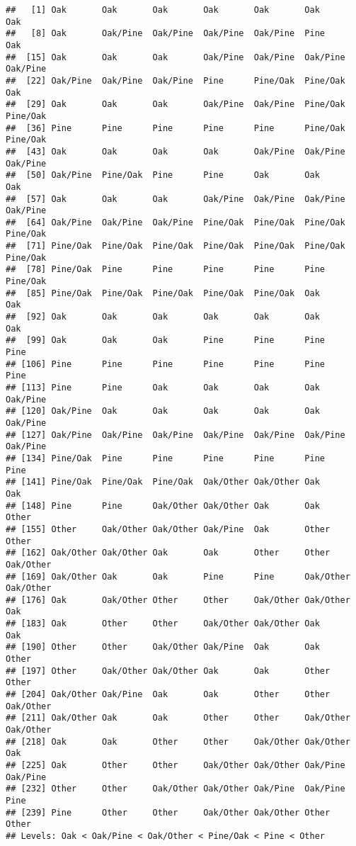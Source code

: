 \documentclass[
]{article}
\begin{document}
\begin{verbatim}
##   [1] Oak       Oak       Oak       Oak       Oak       Oak       Oak      
##   [8] Oak       Oak/Pine  Oak/Pine  Oak/Pine  Oak/Pine  Pine      Oak      
##  [15] Oak       Oak       Oak       Oak/Pine  Oak/Pine  Oak/Pine  Oak/Pine 
##  [22] Oak/Pine  Oak/Pine  Oak/Pine  Pine      Pine/Oak  Pine/Oak  Oak      
##  [29] Oak       Oak       Oak       Oak/Pine  Oak/Pine  Pine/Oak  Pine/Oak 
##  [36] Pine      Pine      Pine      Pine      Pine      Pine/Oak  Pine/Oak 
##  [43] Oak       Oak       Oak       Oak       Oak/Pine  Oak/Pine  Oak/Pine 
##  [50] Oak/Pine  Pine/Oak  Pine      Pine      Oak       Oak       Oak      
##  [57] Oak       Oak       Oak       Oak/Pine  Oak/Pine  Oak/Pine  Oak/Pine 
##  [64] Oak/Pine  Oak/Pine  Oak/Pine  Pine/Oak  Pine/Oak  Pine/Oak  Pine/Oak 
##  [71] Pine/Oak  Pine/Oak  Pine/Oak  Pine/Oak  Pine/Oak  Pine/Oak  Pine/Oak 
##  [78] Pine/Oak  Pine      Pine      Pine      Pine      Pine      Pine/Oak 
##  [85] Pine/Oak  Pine/Oak  Pine/Oak  Pine/Oak  Pine/Oak  Oak       Oak      
##  [92] Oak       Oak       Oak       Oak       Oak       Oak       Oak      
##  [99] Oak       Oak       Oak       Pine      Pine      Pine      Pine     
## [106] Pine      Pine      Pine      Pine      Pine      Pine      Pine     
## [113] Pine      Pine      Oak       Oak       Oak       Oak       Oak/Pine 
## [120] Oak/Pine  Oak       Oak       Oak       Oak       Oak       Oak/Pine 
## [127] Oak/Pine  Oak/Pine  Oak/Pine  Oak/Pine  Oak/Pine  Oak/Pine  Oak/Pine 
## [134] Pine/Oak  Pine      Pine      Pine      Pine      Pine      Pine     
## [141] Pine/Oak  Pine/Oak  Pine/Oak  Oak/Other Oak/Other Oak       Oak      
## [148] Pine      Pine      Oak/Other Oak/Other Oak       Oak       Other    
## [155] Other     Oak/Other Oak/Other Oak/Pine  Oak       Other     Other    
## [162] Oak/Other Oak/Other Oak       Oak       Other     Other     Oak/Other
## [169] Oak/Other Oak       Oak       Pine      Pine      Oak/Other Oak/Other
## [176] Oak       Oak/Other Other     Other     Oak/Other Oak/Other Oak      
## [183] Oak       Other     Other     Oak/Other Oak/Other Oak       Oak      
## [190] Other     Other     Oak/Other Oak/Pine  Oak       Oak       Other    
## [197] Other     Oak/Other Oak/Other Oak       Oak       Other     Other    
## [204] Oak/Other Oak/Pine  Oak       Oak       Other     Other     Oak/Other
## [211] Oak/Other Oak       Oak       Other     Other     Oak/Other Oak/Other
## [218] Oak       Oak       Other     Other     Oak/Other Oak/Other Oak      
## [225] Oak       Other     Other     Oak/Other Oak/Other Oak/Pine  Oak/Pine 
## [232] Other     Other     Oak/Other Oak/Other Oak/Pine  Oak/Pine  Pine     
## [239] Pine      Other     Other     Oak/Other Oak/Other Other     Other    
## Levels: Oak < Oak/Pine < Oak/Other < Pine/Oak < Pine < Other
\end{verbatim}
\end{document}
